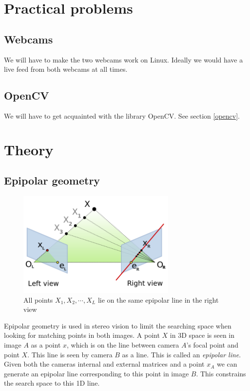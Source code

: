 \documentclass[a4paper]{article}
\begin{document}
\section{Practical problems}

\subsection{Webcams} 
We will have to make the two webcams work on Linux. Ideally we would
have a live feed from both webcams at all times.

\subsection{OpenCV} 
We will have to get acquainted with the library OpenCV. See section
\ref{opencv}.

\section{Theory}

\subsection{Epipolar geometry}
\label{epipolar}

\begin{figure}[h!]
  \centering
  \includegraphics[width=0.7\textwidth]{Epipolar_geometry}
  \caption{All points $X_{1}, X_{2}, \cdots, X_{L}$ lie on the same
epipolar line in the right view}
  \label{fig:epipole}
\end{figure}

Epipolar geometry is used in stereo vision to limit the searching
space when looking for matching points in both images. A point $X$ in
3D space is seen in image $A$ as a point $x$, which is on the line
between camera $A$'s focal point and point $X$. This line is seen by
camera $B$ as a line. This is called an \emph{epipolar line}. Given
both the cameras internal and external matrices and a point $x_A$ we
can generate an epipolar line corresponding to this point in image
$B$. This constrains the search space to this 1D line.
\end{document}
